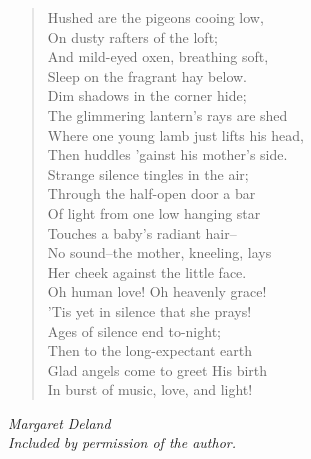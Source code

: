 
\begin{verse}
Hushed are the pigeons cooing low,\\
\hspace*{2em}On dusty rafters of the loft;\\
\hspace*{2em}And mild-eyed oxen, breathing soft,\\
Sleep on the fragrant hay below.\\[0.7em]

Dim shadows in the corner hide;\\
\hspace*{2em}The glimmering lantern's rays are shed\\
\hspace*{2em}Where one young lamb just lifts his head,\\
Then huddles 'gainst his mother's side.\\[0.7em]

Strange silence tingles in the air;\\
\hspace*{2em}Through the half-open door a bar\\
\hspace*{2em}Of light from one low hanging star\\
Touches a baby's radiant hair--\\[0.7em]

No sound--the mother, kneeling, lays\\
\hspace*{2em}Her cheek against the little face.\\
\hspace*{2em}Oh human love! Oh heavenly grace!\\
'Tis yet in silence that she prays!\\[0.7em]

Ages of silence end to-night;\\
\hspace*{2em}Then to the long-expectant earth\\
\hspace*{2em}Glad angels come to greet His birth\\
In burst of music, love, and light!%
\end{verse}

\vspace{0.5\baselineskip}
\noindent\textit{Margaret Deland}\\
\noindent\textit{Included by permission of the author.}

\newpage
